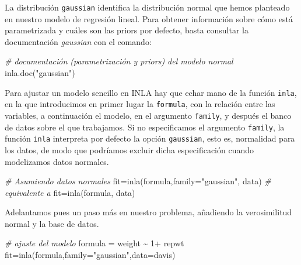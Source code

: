 \documentclass[
]{book}
\newenvironment{Shaded}{\begin{snugshade}}{\end{snugshade}}
\newcommand{\AttributeTok}[1]{\textcolor[rgb]{0.77,0.63,0.00}{#1}}
\newcommand{\CommentTok}[1]{\textcolor[rgb]{0.56,0.35,0.01}{\textit{#1}}}
\newcommand{\DecValTok}[1]{\textcolor[rgb]{0.00,0.00,0.81}{#1}}
\newcommand{\FunctionTok}[1]{\textcolor[rgb]{0.00,0.00,0.00}{#1}}
\newcommand{\NormalTok}[1]{#1}
\newcommand{\OtherTok}[1]{\textcolor[rgb]{0.56,0.35,0.01}{#1}}
\newcommand{\SpecialCharTok}[1]{\textcolor[rgb]{0.00,0.00,0.00}{#1}}
\newcommand{\StringTok}[1]{\textcolor[rgb]{0.31,0.60,0.02}{#1}}
\begin{document}
La distribución \texttt{gaussian} identifica la distribución normal que hemos planteado en nuestro modelo de regresión lineal. Para obtener información sobre cómo está parametrizada y cuáles son las priors por defecto, basta consultar la documentación \emph{gaussian} con el comando:

\begin{Shaded}
\begin{Highlighting}[]
\CommentTok{\# documentación (parametrización y priors) del modelo normal}
\FunctionTok{inla.doc}\NormalTok{(}\StringTok{"gaussian"}\NormalTok{)}
\end{Highlighting}
\end{Shaded}

Para ajustar un modelo sencillo en INLA hay que echar mano de la función \texttt{inla}, en la que introducimos en primer lugar la \texttt{formula}, con la relación entre las variables, a continuación el modelo, en el argumento \texttt{family}, y después el banco de datos sobre el que trabajamos. Si no especificamos el argumento \texttt{family}, la función \texttt{inla} interpreta por defecto la opción \texttt{gaussian}, esto es, normalidad para los datos, de modo que podríamos excluir dicha especificación cuando modelizamos datos normales.

\begin{Shaded}
\begin{Highlighting}[]
\CommentTok{\# Asumiendo datos normales}
\NormalTok{fit}\OtherTok{=}\FunctionTok{inla}\NormalTok{(formula,}\AttributeTok{family=}\StringTok{"gaussian"}\NormalTok{, data)}
\CommentTok{\# equivalente a}
\NormalTok{fit}\OtherTok{=}\FunctionTok{inla}\NormalTok{(formula, data)}
\end{Highlighting}
\end{Shaded}

Adelantamos pues un paso más en nuestro problema, añadiendo la verosimilitud normal y la base de datos.

\begin{Shaded}
\begin{Highlighting}[]
\CommentTok{\# ajuste del modelo}
\NormalTok{formula }\OtherTok{=}\NormalTok{ weight }\SpecialCharTok{\textasciitilde{}} \DecValTok{1}\SpecialCharTok{+}\NormalTok{ repwt}
\NormalTok{fit}\OtherTok{=}\FunctionTok{inla}\NormalTok{(formula,}\AttributeTok{family=}\StringTok{"gaussian"}\NormalTok{,}\AttributeTok{data=}\NormalTok{davis)}
\end{Highlighting}
\end{Shaded}
\end{document}
